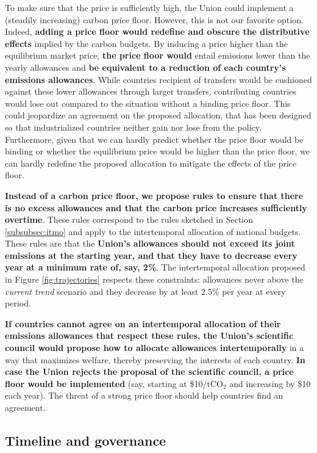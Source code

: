 \documentclass[12pt,english]{article}
\begin{document}
To make sure that the price is sufficiently high, the Union could implement a (steadily increasing) carbon price floor. However, this is not our favorite option. Indeed, \textbf{adding a price floor would redefine and obscure the distributive effects} implied by the carbon budgets. By inducing a price higher than the equilibrium market price, \textbf{the price floor would} entail emissions lower than the yearly allowances and \textbf{be equivalent to a reduction of each country's emissions allowances}. While countries recipient of transfers would be cushioned against these lower allowances through larger transfers, contributing countries would lose out compared to the situation without a binding price floor. This could jeopardize an agreement on the proposed allocation, that has been designed so that industrialized countries neither gain nor lose from the policy. Furthermore, given that we can hardly predict whether the price floor would be binding or whether the equilibrium price would be higher than the price floor, we can hardly redefine the proposed allocation to mitigate the effects of the price floor.

\textbf{Instead of a carbon price floor, we propose rules to ensure that there is no excess allowances and that the carbon price increases sufficiently overtime}. These rules correspond to the rules sketched in Section \ref{subsubsec:itmo} and apply to the intertemporal allocation of national budgets. These rules are that the \textbf{Union's allowances should not exceed its joint emissions at the starting year, and that they have to decrease every year at a minimum rate of, say, 2\%}. The intertemporal allocation proposed in Figure \ref{fig:trajectories} respects these constraints: allowances never above the \textit{current trend} scenario and they decrease by at least 2.5\% per year at every period.

\textbf{If countries cannot agree on an intertemporal allocation of their emissions allowances that respect these rules, the Union's scientific council would propose how to allocate allowances intertemporally} in a way that maximizes welfare, thereby preserving the interests of each country. \textbf{In case the Union rejects the proposal of the scientific council, a price floor would be implemented} (say, starting at \$10/tCO$_\text{2}$ and increasing by \$10 each year). The threat of a strong price floor should help countries find an agreement.

\subsection{Timeline and governance\label{subsec:implementation}}
\end{document}
